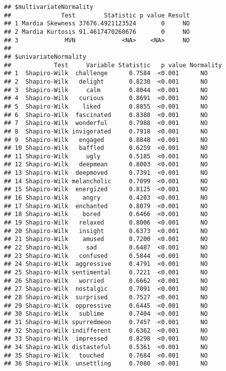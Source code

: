 \documentclass[
]{article}
\begin{document}
\begin{verbatim}
## $multivariateNormality
##              Test        Statistic p value Result
## 1 Mardia Skewness 37676.4921123524       0     NO
## 2 Mardia Kurtosis 91.4617470260676       0     NO
## 3             MVN             <NA>    <NA>     NO
## 
## $univariateNormality
##            Test     Variable Statistic   p value Normality
## 1  Shapiro-Wilk  challenge      0.7584  <0.001      NO    
## 2  Shapiro-Wilk   delight       0.8230  <0.001      NO    
## 3  Shapiro-Wilk     calm        0.8044  <0.001      NO    
## 4  Shapiro-Wilk   curious       0.8691  <0.001      NO    
## 5  Shapiro-Wilk    liked        0.8855  <0.001      NO    
## 6  Shapiro-Wilk  fascinated     0.8388  <0.001      NO    
## 7  Shapiro-Wilk  wonderful      0.7988  <0.001      NO    
## 8  Shapiro-Wilk invigorated     0.7918  <0.001      NO    
## 9  Shapiro-Wilk   engaged       0.8848  <0.001      NO    
## 10 Shapiro-Wilk   baffled       0.6259  <0.001      NO    
## 11 Shapiro-Wilk     ugly        0.5185  <0.001      NO    
## 12 Shapiro-Wilk   deepmean      0.8003  <0.001      NO    
## 13 Shapiro-Wilk  deepmoved      0.7391  <0.001      NO    
## 14 Shapiro-Wilk melancholic     0.7099  <0.001      NO    
## 15 Shapiro-Wilk  energized      0.8125  <0.001      NO    
## 16 Shapiro-Wilk    angry        0.4203  <0.001      NO    
## 17 Shapiro-Wilk  enchanted      0.8079  <0.001      NO    
## 18 Shapiro-Wilk    bored        0.6466  <0.001      NO    
## 19 Shapiro-Wilk   relaxed       0.8006  <0.001      NO    
## 20 Shapiro-Wilk   insight       0.6373  <0.001      NO    
## 21 Shapiro-Wilk    amused       0.7200  <0.001      NO    
## 22 Shapiro-Wilk     sad         0.6487  <0.001      NO    
## 23 Shapiro-Wilk   confused      0.5844  <0.001      NO    
## 24 Shapiro-Wilk  aggressive     0.4791  <0.001      NO    
## 25 Shapiro-Wilk sentimental     0.7221  <0.001      NO    
## 26 Shapiro-Wilk   worried       0.6662  <0.001      NO    
## 27 Shapiro-Wilk  nostalgic      0.7091  <0.001      NO    
## 28 Shapiro-Wilk  surprised      0.7527  <0.001      NO    
## 29 Shapiro-Wilk  oppressive     0.6445  <0.001      NO    
## 30 Shapiro-Wilk   sublime       0.7404  <0.001      NO    
## 31 Shapiro-Wilk spurredmeon     0.7457  <0.001      NO    
## 32 Shapiro-Wilk indifferent     0.6362  <0.001      NO    
## 33 Shapiro-Wilk  impressed      0.8298  <0.001      NO    
## 34 Shapiro-Wilk distasteful     0.5361  <0.001      NO    
## 35 Shapiro-Wilk   touched       0.7684  <0.001      NO    
## 36 Shapiro-Wilk  unsettling     0.7080  <0.001      NO    

\end{verbatim}
\end{document}
